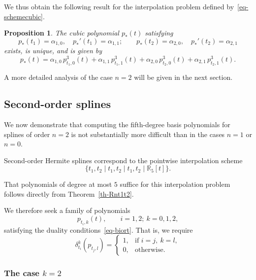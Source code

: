 \documentclass{article}
\newtheorem{proposition}[theorem]{Proposition}	%
\theoremstyle{definition}
\theoremstyle{definition}
\numberwithin{figure}{section}
\newcommand{\1}{\mathbf{1}}
\begin{document}
We thus obtain the following result for the interpolation problem defined by~\eqref{eq-schemecubic}.

\begin{proposition}
    The cubic polynomial $p_*(t)$ satisfying
    \[
        p_*(t_1) = \alpha_{1,0},\quad
        p_*'(t_1) = \alpha_{1,1};\qquad
        p_*(t_2) = \alpha_{2,0},\quad
        p_*'(t_2) = \alpha_{2,1}
    \]
    exists, is unique, and is given by
    \[
        p_*(t)
        =
        \alpha_{1,0}\,p^{3}_{t_1,0}(t)
        +
        \alpha_{1,1}\,p^{3}_{t_1,1}(t)
        +
        \alpha_{2,0}\,p^{3}_{t_2,0}(t)
        +
        \alpha_{2,1}\,p^{3}_{t_2,1}(t).
    \]
\end{proposition}

A more detailed analysis of the case $n = 2$ will be given in the next section.

\subsection{Second-order splines}\label{sec-splines2ord}

We now demonstrate that computing the fifth-degree basis polynomials for splines of order $n = 2$ is not substantially more difficult than in the cases $n = 1$ or $n = 0$.

Second-order Hermite splines correspond to the pointwise interpolation scheme
\[
    \{t_1, t_2 \mid t_1, t_2 \mid t_1, t_2 \mid \mathbb{R}_{5}[t]\}.
\]

That polynomials of degree at most $5$ suffice for this interpolation problem follows directly from Theorem~\ref{th-Rnt1t2}.

\bigskip

We therefore seek a family of polynomials
\[
    p_{t_i,k}(t), \qquad i = 1,2;\ k = 0,1,2,
\]
satisfying the duality conditions~\eqref{eq-biort}.  
That is, we require
\begin{equation}\label{bi-property-Rn}
    \delta^k_{t_i}\!\left(p_{t_j,l}\right)
    =
    \begin{cases}
        1, & \text{if } i = j,\ k = l,\\[4pt]
        0, & \text{otherwise}.
    \end{cases}
\end{equation}

\subsubsection*{The case $k = 2$}
\end{document}
